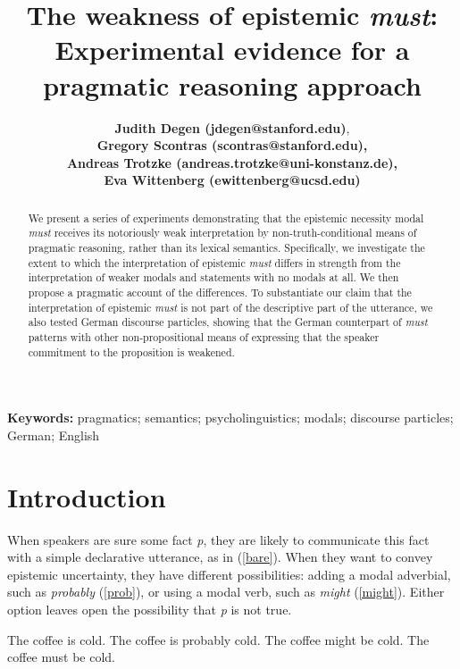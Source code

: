 \documentclass[11pt]{article}
\title{The weakness of epistemic \emph{must}: Experimental evidence for a pragmatic reasoning approach}
\author{{\large \bf Judith Degen (jdegen@stanford.edu)}, \\ {\large \bf Gregory Scontras (scontras@stanford.edu),}\\ {\large \bf Andreas Trotzke (andreas.trotzke@uni-konstanz.de),}\\ {\large \bf Eva Wittenberg (ewittenberg@ucsd.edu)}}
\begin{document}
\maketitle

\begin{abstract}

We present a series of experiments demonstrating that the epistemic necessity modal \emph{must} receives its notoriously weak interpretation by non-truth-conditional means of pragmatic reasoning, rather than its lexical semantics. Specifically, we investigate the extent to which the interpretation of epistemic \emph{must} differs in strength from the interpretation of weaker modals and statements with no modals at all. We then propose a pragmatic account of the differences. To substantiate our claim that the interpretation of epistemic \emph{must} is not part of the descriptive part of the utterance, we also tested German discourse particles, showing that the German counterpart of \emph{must} patterns with other non-propositional means of expressing that the speaker commitment to the proposition is weakened.	
\end{abstract}

\textbf{Keywords:} 
pragmatics; semantics; psycholinguistics; modals; discourse particles; German; English


\section{Introduction}

When speakers are sure some fact \emph{p}, they are likely to communicate this fact with a simple declarative utterance, as in (\ref{bare}). When they want to convey epistemic uncertainty, they have different possibilities: adding a modal adverbial, such as \emph{probably} (\ref{prob}), or using a modal verb, such as \emph{might} (\ref{might}). Either option leaves open the possibility that \emph{p} is not true.

\begin{exe}
	\ex\label{english} \begin{xlist}
		\ex\label{bare} The coffee is cold.
		\ex\label{prob} The coffee is probably cold.
		\ex\label{might} The coffee might be cold.
		\ex\label{must} The coffee must be cold.
	\end{xlist}
\end{exe}
\end{document}
